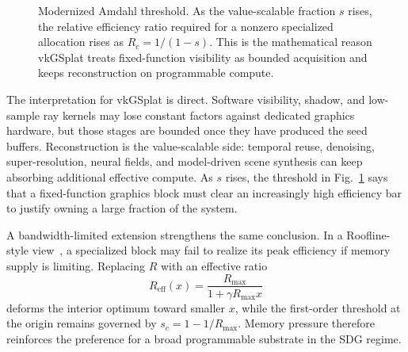 \documentclass[10pt,journal,onecolumn]{IEEEtran}
\begin{document}
\begin{figure}[t]
\centering
{}
\caption{Modernized Amdahl threshold.  As the value-scalable fraction
$s$ rises, the relative efficiency ratio required for a nonzero
specialized allocation rises as $R_c=1/(1-s)$.  This is the mathematical
reason vkGSplat treats fixed-function visibility as bounded acquisition
and keeps reconstruction on programmable compute.}
\label{fig:appendix-amdahl-threshold}
\end{figure}

The interpretation for vkGSplat is direct.  Software visibility, shadow,
and low-sample ray kernels may lose constant factors against dedicated
graphics hardware, but those stages are bounded once they have produced
the seed buffers.  Reconstruction is the value-scalable side: temporal
reuse, denoising, super-resolution, neural fields, and model-driven scene
synthesis can keep absorbing additional effective compute.  As $s$ rises,
the threshold in Fig.~\ref{fig:appendix-amdahl-threshold} says that a
fixed-function graphics block must clear an increasingly high efficiency
bar to justify owning a large fraction of the system.

A bandwidth-limited extension strengthens the same conclusion.  In a
Roofline-style view~\cite{williams2009}, a specialized block may fail to
realize its peak efficiency if memory supply is limiting.  Replacing $R$
with an effective ratio
\begin{equation}
  R_{\mathrm{eff}}(x) =
  \frac{R_{\max}}{1 + \gamma R_{\max}x}
  \label{eq:appendix-reff}
\end{equation}
deforms the interior optimum toward smaller $x$, while the first-order
threshold at the origin remains governed by $s_c=1-1/R_{\max}$.  Memory
pressure therefore reinforces the preference for a broad programmable
substrate in the SDG regime.
\end{document}
